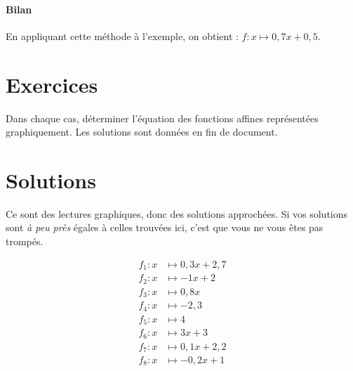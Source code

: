 \documentclass[12pt]{article}
\newcommand{\affine}[5]{
    \draw[dotted,color=gray] (#1,#2) grid (#3,#4);
    \draw[-latex] (#1,0) -- (#3,0);
    \draw[-latex] (0,#2) -- (0,#4);
    \draw (0,0) node[below left]{$\mathcal{O}$};
    \draw (1,0) node[below]{$I$};
    \draw (0,1) node[left]{$J$};

    \foreach \xstart/\xend/\a/\b in {#5} {
      \draw[smooth,blue,domain=\xstart:\xend] plot ({\x},{\a*\x+\b});
    }
}
\begin{document}
  \paragraph{Bilan}
  En appliquant cette méthode à l'exemple, on obtient : $f:x\mapsto 0,7x+0,5$.

  \section{Exercices}

Dans chaque cas, déterminer l'équation des fonctions affines représentées graphiquement. Les solutions sont données en fin de document.

  \hfill

  \section{Solutions}

  Ce sont des lectures graphiques, donc des solutions approchées. Si vos solutions sont \emph{à peu près} égales à celles trouvées ici, c'est que vous ne vous êtes pas trompés.

  \begin{align*}
    f_1:x&\mapsto 0,3x+2,7\\
    f_2:x&\mapsto -1x+2\\
    f_3:x&\mapsto 0,8x\\
    f_4:x&\mapsto -2,3\\
    f_5:x&\mapsto 4\\
    f_6:x&\mapsto 3x+3\\
    f_7:x&\mapsto 0,1x+2,2\\
    f_8:x&\mapsto -0,2x+1\\
  \end{align*}
\end{document}
